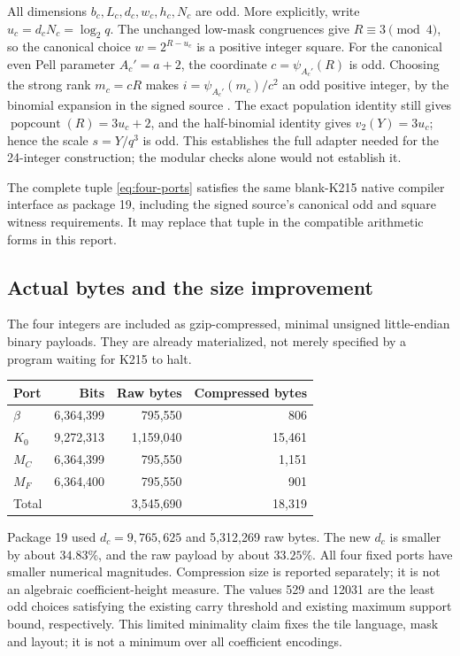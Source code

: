 All dimensions $b_c,L_c,d_c,w_c,h_c,N_c$ are odd.  More explicitly, write
$u_c=d_cN_c=\log_2q$.  The unchanged low-mask congruences give
$R\equiv3\pmod4$, so the canonical choice $w=2^{R-u_c}$ is a positive
integer square.  For the canonical even Pell parameter $A_c'=a+2$,
the coordinate $c=\psi_{A_c'}(R)$ is odd.  Choosing the strong rank
$m_c=cR$ makes $i=\psi_{A_c'}(m_c)/c^2$ an odd positive integer, by
the binomial expansion in the signed source \cite{normalized,oddscale}.
The exact population identity still gives
$\operatorname{popcount}(R)=3u_c+2$, and the half-binomial identity gives
$v_2(Y)=3u_c$; hence the scale $s=Y/q^3$ is odd.
This establishes the full adapter needed for the 24-integer construction;
the modular checks alone would not establish it.

\begin{theorem}\label{thm:coefficients}
The complete tuple \eqref{eq:four-ports} satisfies the same blank-K215
native compiler interface as package 19, including the signed source's
canonical odd and square witness requirements.  It may replace that
tuple in the compatible arithmetic forms in this report.
\end{theorem}

\subsection{Actual bytes and the size improvement}

The four integers are included as gzip-compressed, minimal unsigned
little-endian binary payloads.  They are already materialized, not merely
specified by a program waiting for K215 to halt.
\begin{center}
\begin{tabular}{lrrr}
\toprule
Port & Bits & Raw bytes & Compressed bytes\\
\midrule
$\beta$ & 6,364,399 & 795,550 & 806\\
$K_0$ & 9,272,313 & 1,159,040 & 15,461\\
$M_C$ & 6,364,399 & 795,550 & 1,151\\
$M_F$ & 6,364,400 & 795,550 & 901\\
\midrule
Total & & 3,545,690 & 18,319\\
\bottomrule
\end{tabular}
\end{center}
Package 19 used $d_c=9,765,625$ and 5,312,269 raw bytes.  The new $d_c$
is smaller by about $34.83\%$, and the raw payload by about $33.25\%$.
All four fixed ports have smaller numerical magnitudes.  Compression size
is reported separately; it is not an algebraic coefficient-height measure.
The values 529 and 12031 are the least odd choices satisfying the existing
carry threshold and existing maximum support bound, respectively.  This
limited minimality claim fixes the tile language, mask and layout; it is
not a minimum over all coefficient encodings.

